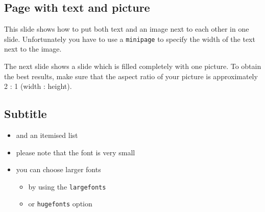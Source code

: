 \documentclass[a4paper]{article}            %
\begin{document}
\begin{slidetop}


\begin{minipage}{12cm}   %
\section*{Page with text and picture}

This slide shows how to put both text and an image next to each other in one slide. Unfortunately you have to use a \verb|minipage| to specify the width of the text next to the image.

The next slide shows a slide which is filled completely with one picture. To obtain the best results, make sure that the aspect ratio of your picture is approximately 2 : 1 (width : height).
\end{minipage}
\end{slidetop}


\begin{slidetop}
\section*{Subtitle}

\begin{itemize}
\item and an itemised list
\item please note that the font is very small
\item you can choose larger fonts
\begin{itemize}
\item by using the \verb|largefonts|
\item or \verb|hugefonts| option
\end{itemize}
\end{itemize}
\end{slidetop}
\end{document}
